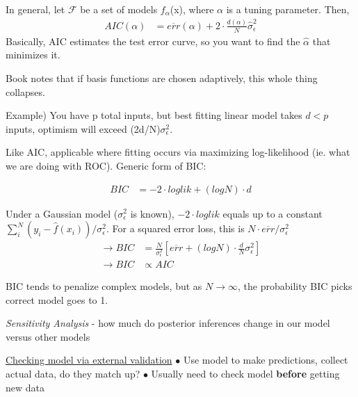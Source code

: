 \documentclass[11pt]{labbook}
\begin{document}
In general, let $\mathcal{F}$ be a set of models $f_{\alpha}$(x), where $\alpha$ is a tuning parameter. Then,
\begin{align*}
AIC(\alpha) &= \overline{err}(\alpha) + 2 \cdot \frac{d(\alpha)}{N}\hat{\sigma}_{\epsilon}^2
\end{align*}
Basically, AIC estimates the test error curve, so you want to find the $\hat{\alpha}$ that minimizes it. 

Book notes that if basis functions are chosen adaptively, this whole thing collapses. 
\newline

Example) You have p total inputs, but best fitting linear model takes $d<p$ inputs, optimism will exceed (2d/N)$\sigma_{\epsilon}^{2}$.

Like AIC, applicable where fitting occurs via maximizing log-likelihood (ie. what we are doing with ROC). Generic form of BIC:

\begin{align*}
BIC &= -2 \cdot loglik + \left(log N\right) \cdot d
\end{align*}

Under a Gaussian model ($\sigma_{\epsilon}^2$ is known), $-2 \cdot loglik$ equals up to a constant $\sum_i^N(y_i -\hat{f}(x_i))/\sigma_{\epsilon}^2$. For a squared error loss, this is $N \cdot \overline{err}/\sigma_{\epsilon}^2$
\begin{align*}
\rightarrow BIC &= \frac{N}{\sigma_{\epsilon}^2}\left[\overline{err} + \left(log N\right) \cdot \frac{d}{N}\sigma_{\epsilon}^2\right] \\
\rightarrow BIC &\propto AIC
\end{align*}

BIC tends to penalize complex models, but as $N \rightarrow \infty$, the probability BIC picks correct model goes to 1.




\textit{Sensitivity Analysis} - how much do posterior inferences change in our model versus other models


\underline{Checking model via external validation} \newline
$\bullet$	Use model to make predictions, collect actual data, do they match up? \newline
$\bullet$ Usually need to check model \textbf{before} getting new data
\end{document}
